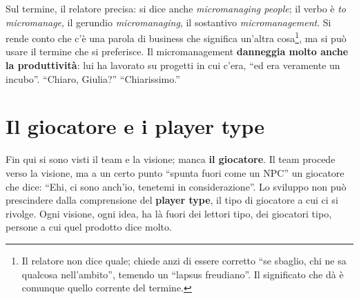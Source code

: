 Sul termine, il relatore precisa: si dice anche \emph{micromanaging people}; il
verbo è \emph{to micromanage}, il gerundio \emph{micromanaging}, il sostantivo
\emph{micromanagement}. Si rende conto che c'è una parola di business che
significa un'altra cosa\footnote{Il relatore non dice quale; chiede anzi di
essere corretto ``se sbaglio, chi ne sa qualcosa nell'ambito'', temendo un
``lapsus freudiano''. Il significato che dà è comunque quello corrente del
termine.}, ma si può usare il termine che si preferisce. Il micromanagement
\textbf{danneggia molto anche la produttività}: lui ha lavorato su progetti in
cui c'era, ``ed era veramente un incubo''. ``Chiaro, Giulia?'' ``Chiarissimo.''

\section{Il giocatore e i player type}
\label{sec:z6-player-type}

Fin qui si sono visti il team e la visione; manca \textbf{il giocatore}. Il team
procede verso la visione, ma a un certo punto ``spunta fuori come un NPC'' un
giocatore che dice: ``Ehi, ci sono anch'io, tenetemi in considerazione''. Lo
sviluppo non può prescindere dalla comprensione del \textbf{player type}, il
tipo di giocatore a cui ci si rivolge. Ogni visione, ogni idea, ha là fuori dei
lettori tipo, dei giocatori tipo, persone a cui quel prodotto dice molto.


